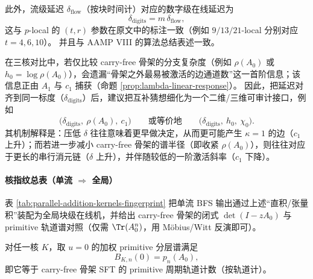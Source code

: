 此外，流级延迟 $\delta_{\mathrm{flow}}$（按块时间计）对应的数字级在线延迟为
\[
\delta_{\mathrm{digits}}=m\,\delta_{\mathrm{flow}},
\]
这与 $p$-local 的 $(t,r)$ 参数在原文中的标注一致（例如 $9/13/21$-local 分别对应 $t=4,6,10$）。\cite{FrougnyHellerPelantovaSvobodovaParallelAlgorithmsSlides,Frougny2012NumbersAsStreamsLeiden}
并且与 AAMP VIII 的算法总结表述一致。 \cite{SvobodovaAAMPVIIIParallelAddition}

\begin{remark}\label{rem:entropy-delay-complement-c1}
在三核对比中，若仅比较 carry-free 骨架的分支复杂度（例如 \(\rho(A_0)\) 或 \(h_0=\log\rho(A_0)\)），会遗漏“骨架之外最易被激活的边通道数”这一首阶信息；该信息正由 \(A_1\) 与 \(c_1\) 捕获（命题 \ref{prop:lambda-linear-response}）。
因此，把延迟对齐到同一标度（\(\delta_{\mathrm{digits}}\)）后，建议把互补猜想细化为一个二维/三维可审计接口，例如
$$
\bigl(\delta_{\mathrm{digits}},\ \rho(A_0),\ c_1\bigr)
\qquad\text{或等价地}\qquad
\bigl(\delta_{\mathrm{digits}},\ h_0,\ \chi_0\bigr).
$$
其机制解释是：压低 \(\delta\) 往往意味着更早做决定，从而更可能产生 \(\kappa=1\) 的边（\(c_1\) 上升）；而若进一步减小 carry-free 骨架的谱半径（即收紧 \(\rho(A_0)\)），则往往对应于更长的串行消元链（\(\delta\) 上升），并伴随较低的一阶激活斜率（\(c_1\) 下降）。
\end{remark}



\paragraph{核指纹总表（单流 $\Rightarrow$ 全局）}
表 \ref{tab:parallel-addition-kernels-fingerprint} 把单流 BFS 输出通过上述“直积/张量积”装配为全局块级在线机，并给出 carry-free 骨架的闭式 $\det(I-zA_0)$ 与 primitive 轨道谱对照（仅需 $\Tr(A_0^n)$，用 Möbius/Witt 反演即可）。


\begin{corollary}\label{cor:Bn0-equals-primitive-skeleton}
对任一核 $K$，取 $u=0$ 的加权 primitive 分层谱满足
\[
B_{K,n}(0)=p_n(A_0),
\]
即它等于 carry-free 骨架 SFT 的 primitive 周期轨道计数（按轨道计）。
\end{corollary}




